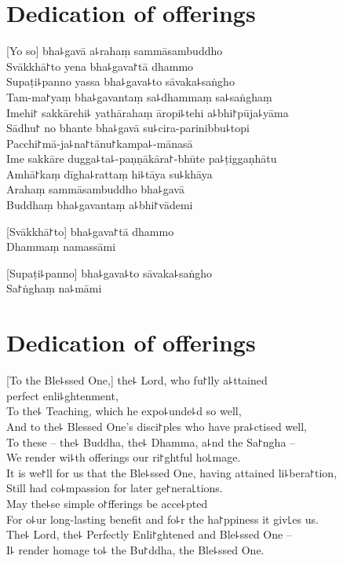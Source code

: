 
\chapter{Dedication of offerings}%

[Yo so] bha꜕gavā a꜕rahaṃ sammāsambuddho\\
Svākkhā꜓to yena bha꜕gava꜓tā dhammo\\
Supaṭi꜕panno yassa bha꜕gava꜕to sāvaka꜕saṅgho\\
Tam-ma꜓yaṃ bha꜕gavantaṃ sa꜕dhammaṃ sa꜕saṅghaṃ\\
Imehi꜓ sakkārehi꜕ yathārahaṃ āropi꜕tehi a꜕bhi꜓pūja꜕yāma\\
Sādhu꜓ no bhante bha꜕gavā su꜕cira-parinibbu꜕topi\\
Pacchi꜓mā-ja꜕na꜓tānu꜓kampa꜕-mānasā\\
Ime sakkāre dugga꜕ta꜕-paṇṇākāra꜓-bhūte pa꜕ṭiggaṇhātu\\
Amhā꜓kaṃ dīgha꜕rattaṃ hi꜕tāya su꜕khāya\\
Arahaṃ sammāsambuddho bha꜕gavā\\
Buddhaṃ bha꜕gavantaṃ a꜕bhi꜓vādemi 

[Svākkhā꜓to] bha꜕gava꜓tā dhammo\\
Dhammaṃ namassāmi 

[Supaṭi꜕panno] bha꜕gava꜕to sāvaka꜕saṅgho\\
Sa꜓ṅghaṃ na꜕māmi 

\clearpage

\chapter{Dedication of offerings}%

[To the Ble꜕ssed One,] the꜕ Lord, who fu꜓lly a꜕ttained\\
\vin perfect enli꜕ghtenment,\\
To the꜕ Teaching, which he expo꜕unde꜕d so well,\\
And to the꜕ Blessed One's disci꜓ples who have pra꜕ctised well,\\
To these -- the꜕ Buddha, the꜕ Dhamma, a꜕nd the Sa꜓ngha --\\
We render wi꜕th offerings our ri꜓ghtful ho꜖mage.\\
It is we꜓ll for us that the Ble꜕ssed One, having attained li꜕bera꜓tion,\\
Still had co꜕mpassion for later ge꜓nera꜖tions.\\
May the꜕se simple o꜓fferings be acce꜕pted\\
For o꜕ur long-lasting benefit and fo꜕r the ha꜓ppiness it giv꜖es us.\\
The꜕ Lord, the꜕ Perfectly Enli꜓ghtened and Ble꜕ssed One --\\
I꜕ render homage to꜕ the Bu꜓ddha, the Ble꜕ssed One. 


